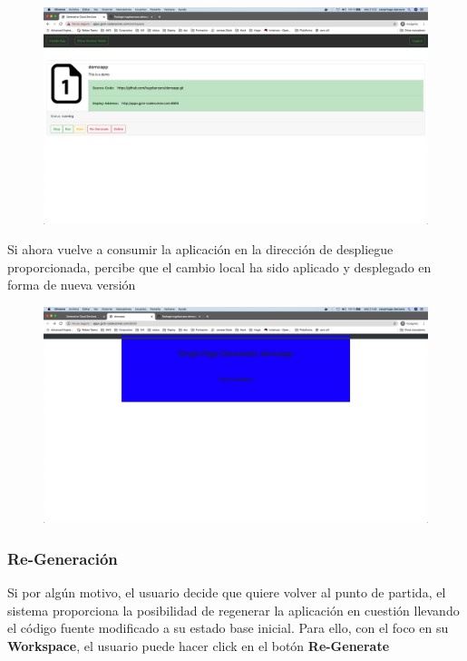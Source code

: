 \documentclass[a4paper,11pt]{book}
\begin{document}
 
   \begin{figure}[H]
\centering
\includegraphics[scale=0.2]{imagenes/casouso/3_10.png}
\caption{   }
\end{figure}
 
 Si ahora vuelve a consumir la aplicación en la dirección de despliegue proporcionada, percibe que el cambio local ha sido aplicado y desplegado en forma de nueva versión
 
 
   \begin{figure}[H]
\centering
\includegraphics[scale=0.2]{imagenes/casouso/3_11.png}
\caption{   }
\end{figure}


\subsubsection{Re-Generación}

Si por algún motivo, el usuario decide que quiere volver al punto de partida, el sistema proporciona la posibilidad de regenerar la aplicación en cuestión llevando el código fuente modificado a su estado base inicial. Para ello, con el foco en su \textbf{Workspace}, el usuario puede hacer click en el botón \textbf{Re-Generate}
\end{document}
